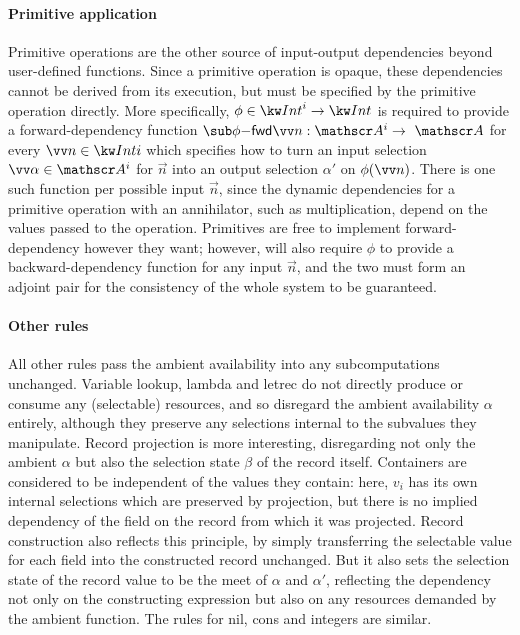 \paragraph{Primitive application} Primitive operations are the other source of input-output dependencies beyond user-defined functions. Since a primitive operation is opaque, these dependencies cannot be derived from its execution, but must be specified by the primitive operation directly. More specifically, $\phi \in \tyInt^{i} \to \tyInt$ is required to provide a forward-dependency function $\primFwdBool{\phi}{\vec{n}}: \Ann{A}^i \to \Ann{A}$ for every $\vec{n} \in \tyInt{i}$ which specifies how to turn an input selection $\vec{\alpha} \in \Ann{A}^i$ for $\vec{n}$ into an output selection $\alpha'$ on $\exAppPrim{\phi}{\vec{n}}$. There is one such function per possible input $\vec{n}$, since the dynamic dependencies for a primitive operation with an annihilator, such as multiplication, depend on the values passed to the operation. Primitives are free to implement forward-dependency however they want; however,  will also require $\phi$ to provide a backward-dependency function for any input $\vec{n}$, and the two must form an adjoint pair for the consistency of the whole system to be guaranteed.

\paragraph{Other rules} All other rules pass the ambient availability into any subcomputations unchanged. Variable lookup, lambda and letrec do not directly produce or consume any (selectable) resources, and so disregard the ambient availability $\alpha$ entirely, although they preserve any selections internal to the subvalues they manipulate. Record projection is more interesting, disregarding not only the ambient $\alpha$ but also the selection state $\beta$ of the record itself. Containers are considered to be independent of the values they contain: here, $v_i$ has its own internal selections which are preserved by projection, but there is no implied dependency of the field on the record from which it was projected. Record construction also reflects this principle, by simply transferring the selectable value for each field into the constructed record unchanged. But it also sets the selection state of the record value to be the meet of $\alpha$ and $\alpha'$, reflecting the dependency not only on the constructing expression but also on any resources demanded by the ambient function. The rules for nil, cons and integers are similar.

